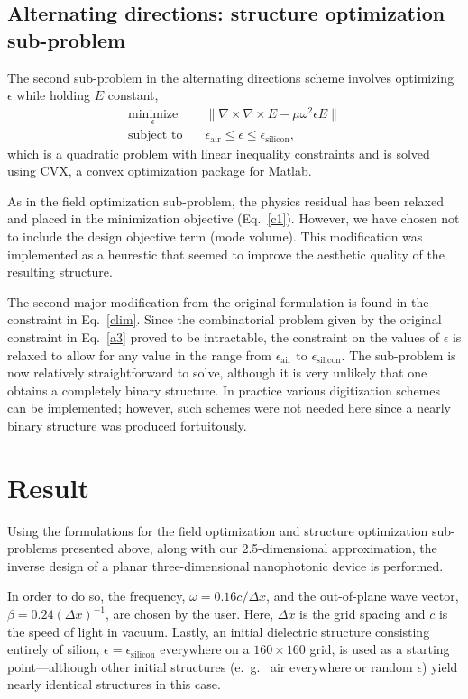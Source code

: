 \documentclass[10pt,letterpaper]{article}
\begin{document}
\subsection{Alternating directions: structure optimization sub-problem}
The second sub-problem in the alternating directions scheme involves optimizing $\epsilon$ while holding $E$ constant,
\begin{align}
\underset{\epsilon}{\text{minimize}} \quad& \|\nabla\times\nabla\times E - \mu\omega^2\epsilon E\| \label{c1} \\
\text{subject to} \quad 
    & \epsilon_\text{air} \le \epsilon \le \epsilon_\text{silicon}, \label{clim}
\end{align}
which is a quadratic problem with linear inequality constraints and is solved using CVX\cite{cvx}, a convex optimization package for Matlab.

As in the field optimization sub-problem, the physics residual has been relaxed and placed in the minimization objective (Eq.~\ref{c1}). However, we have chosen not to include the design objective term (mode volume). This modification was implemented as a heurestic that seemed to improve the aesthetic quality of the resulting structure.

The second major modification from the original formulation is found in the constraint in Eq.~\ref{clim}. Since the combinatorial problem given by the original constraint in Eq.~\ref{a3} proved to be intractable, the constraint on the values of $\epsilon$ is relaxed to allow for any value in the range from $\epsilon_\text{air}$ to $\epsilon_\text{silicon}$. The sub-problem is now relatively straightforward to solve, although it is very unlikely that one obtains a completely binary structure. In practice various digitization schemes can be implemented\cite{digitize}; however, such schemes were not needed here since a nearly binary structure was produced fortuitously.

\section{Result}
Using the formulations for the field optimization and structure optimization sub-problems presented above, along with our 2.5-dimensional approximation, the inverse design of a planar three-dimensional nanophotonic device is performed.

In order to do so, the frequency, $\omega = 0.16 c/\Delta x$, and the out-of-plane wave vector, $\beta = 0.24 (\Delta x)^{-1}$, are chosen by the user. Here, $\Delta x$ is the grid spacing and $c$ is the speed of light in vacuum. Lastly, an initial dielectric structure consisting entirely of silion, $\epsilon = \epsilon_\text{silicon}$ everywhere on a $160 \times 160$ grid, is used as a starting point---although other initial structures (e.~g.~ air everywhere or random $\epsilon$) yield nearly identical structures in this case.
\end{document}
